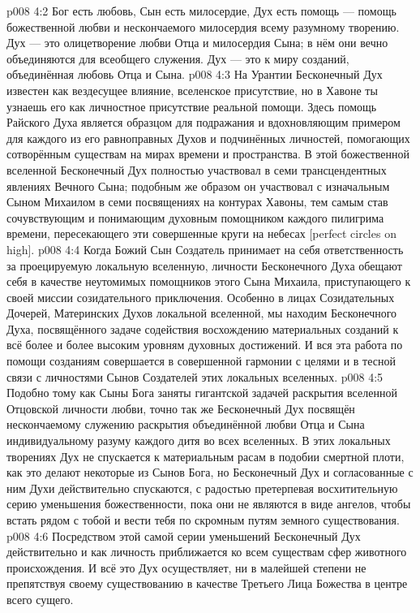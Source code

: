 \vs p008 4:2 Бог есть любовь, Сын есть милосердие, Дух есть помощь --- помощь божественной любви и нескончаемого милосердия всему разумному творению. Дух --- это олицетворение любви Отца и милосердия Сына; в нём они вечно объединяются для всеобщего служения. Дух --- это  к миру созданий, объединённая любовь Отца и Сына.
\vs p008 4:3 На Урантии Бесконечный Дух известен как вездесущее влияние, вселенское присутствие, но в Хавоне ты узнаешь его как личностное присутствие реальной помощи. Здесь помощь Райского Духа является образцом для подражания и вдохновляющим примером для каждого из его равноправных Духов и подчинённых личностей, помогающих сотворённым существам на мирах времени и пространства. В этой божественной вселенной Бесконечный Дух полностью участвовал в семи трансцендентных явлениях Вечного Сына; подобным же образом он участвовал с изначальным Сыном Михаилом в семи посвящениях на контурах Хавоны, тем самым став сочувствующим и понимающим духовным помощником каждого пилигрима времени, пересекающего эти совершенные круги на небесах [perfect circles on high].
\vs p008 4:4 \pc Когда Божий Сын Создатель принимает на себя ответственность за проецируемую локальную вселенную, личности Бесконечного Духа обещают себя в качестве неутомимых помощников этого Сына Михаила, приступающего к своей миссии созидательного приключения. Особенно в лицах Созидательных Дочерей, Материнских Духов локальной вселенной, мы находим Бесконечного Духа, посвящённого задаче содействия восхождению материальных созданий к всё более и более высоким уровням духовных достижений. И вся эта работа по помощи созданиям совершается в совершенной гармонии с целями и в тесной связи с личностями Сынов Создателей этих локальных вселенных.
\vs p008 4:5 Подобно тому как Сыны Бога заняты гигантской задачей раскрытия вселенной Отцовской личности любви, точно так же Бесконечный Дух посвящён нескончаемому служению раскрытия объединённой любви Отца и Сына индивидуальному разуму каждого дитя во всех вселенных. В этих локальных творениях Дух не спускается к материальным расам в подобии смертной плоти, как это делают некоторые из Сынов Бога, но Бесконечный Дух и согласованные с ним Духи действительно спускаются, с радостью претерпевая восхитительную серию уменьшения божественности, пока они не являются в виде ангелов, чтобы встать рядом с тобой и вести тебя по скромным путям земного существования.
\vs p008 4:6 Посредством этой самой серии уменьшений Бесконечный Дух действительно и как личность приближается ко всем существам сфер животного происхождения. И всё это Дух осуществляет, ни в малейшей степени не препятствуя своему существованию в качестве Третьего Лица Божества в центре всего сущего.
